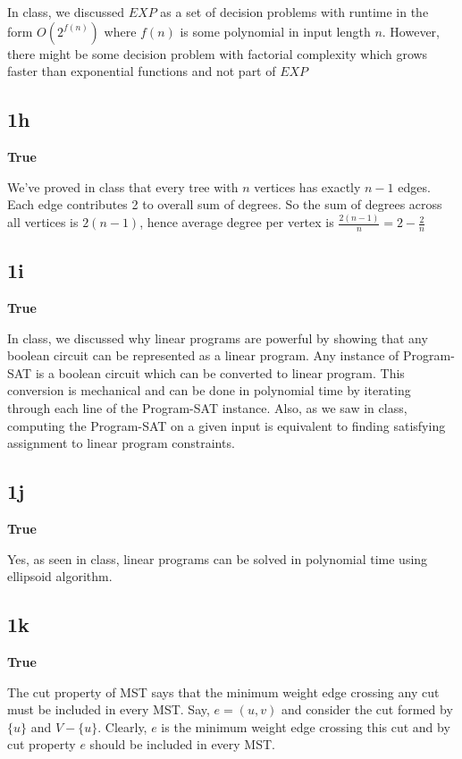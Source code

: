 \documentclass{article}
\begin{document}
    In class, we discussed $EXP$ as a set of decision problems with runtime in the form $O(2^{f(n)})$ where $f(n)$ is some polynomial in input length $n$. However, there might be some decision problem with factorial complexity which grows faster than exponential functions and not part of $EXP$

    \subsection*{1h}
    \textbf{True}

    We've proved in class that every tree with $n$ vertices has exactly $n-1$ edges. Each edge contributes 2 to overall sum of degrees. So the sum of degrees across all vertices is $2(n-1)$, hence average degree per vertex is $\frac{2(n-1)}{n} = 2 - \frac{2}{n}$

    \subsection*{1i}
    \textbf{True}

    In class, we discussed why linear programs are powerful by showing that any boolean circuit can be represented as a linear program. Any instance of Program-SAT is a boolean circuit which can be converted to linear program. This conversion is mechanical and can be done in polynomial time by iterating through each line of the Program-SAT instance. Also, as we saw in class, computing the Program-SAT on a given input is equivalent to finding satisfying assignment to linear program constraints.

    \subsection*{1j}
    \textbf{True}

    Yes, as seen in class, linear programs can be solved in polynomial time using ellipsoid algorithm.

    \subsection*{1k}
    \textbf{True}

    The cut property of MST says that the minimum weight edge crossing any cut must be included in every MST. Say, $e = (u, v)$ and consider the cut formed by $\{u\}$ and $V - \{u\}$. Clearly, $e$ is the minimum weight edge crossing this cut and by cut property $e$ should be included in every MST.
\end{document}
